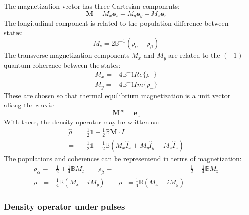 The magnetization vector has three Cartesian components:
\begin{equation}
  \mathbf{M} = M_x\mathbf{e}_x + M_y\mathbf{e}_y + M_z\mathbf{e}_z
\end{equation}
 The longitudinal component is related to the population difference between states:
 \begin{equation}
   M_z = 2\mathbb{B}^{-1}(\rho_\alpha - \rho_\beta)
 \end{equation}
The transverse magnetization components $M_x$ and $M_y$ are related to the $(-1)$-quantum coherence between the states:
\begin{align}
  M_x =& 4\mathbb{B}^-1Re\{\rho_-\}\\
  M_y =& 4\mathbb{B}^-1Im\{\rho_-\}
\end{align}
These are chosen so that thermal equilibrium magnetization is a unit vector
aliong the $z$-axis:
\begin{equation}
  \mathbf{M}^{\text{eq}} = \mathbf{e}_z
\end{equation}
With these, the density operator may be written as:
\begin{align}
  \hat{\rho} =& \frac{1}{2}\mathbb{1} + \frac{1}{2}\mathbb{B}\mathbf{M}\cdot{I}\\
  =& \frac{1}{2}\mathbb{1} + \frac{1}{2}\mathbb{B}(M_x\hat{I}_x + M_y\hat{I}_y + M_z\hat{I}_z)
\end{align}
The populations and coherences can be representend in terms of magnetization:
\begin{align}
  \rho_\alpha =& \frac{1}{2} + \frac{1}{4}\mathbb{B}M_z \qquad \rho_\beta =& \frac{1}{2} - \frac{1}{4}\mathbb{B}M_z\\
  \rho_+ =&  \frac{1}{4}\mathbb{B}(M_x - iM_y) \qquad \rho_- = \frac{1}{4}\mathbb{B}(M_x + iM_y)
\end{align}

\subsubsection{Density operator under pulses}

